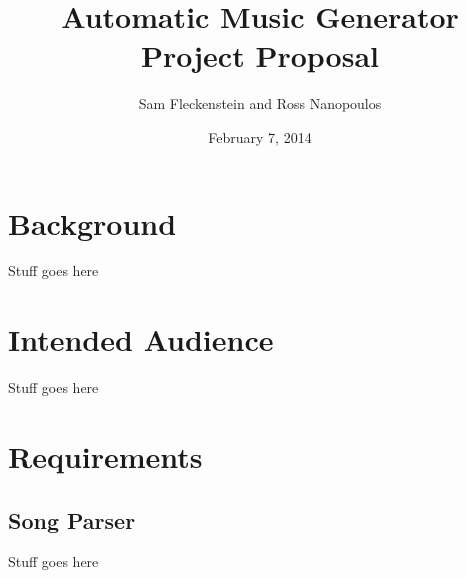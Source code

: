 \documentclass{article}
\begin{document}
\clearpage
{}
\begin{center}
\begin{minipage}{.6\textwidth}

\title{Automatic Music Generator \\ \vspace{2 pt} \Large{Project Proposal}}
\author{Sam Fleckenstein and Ross Nanopoulos}
\date{February 7, 2014}
\maketitle

\end{minipage}
\end{center}
\clearpage

\tableofcontents
\newpage

\section{Background}
Stuff goes here

\section{Intended Audience}
Stuff goes here

\section{Requirements}
\subsection{Song Parser}
Stuff goes here
\end{document}
